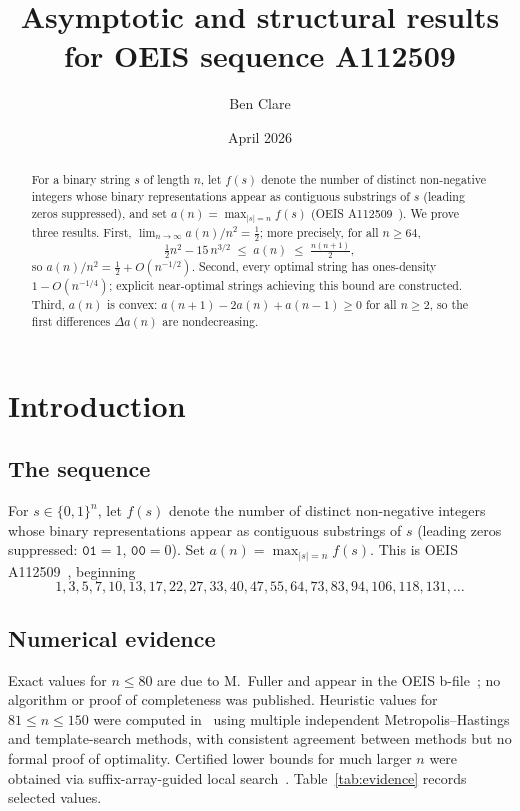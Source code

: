 ﻿\documentclass[11pt,a4paper]{article}
\title{Asymptotic and structural results for OEIS sequence A112509}
\author{Ben Clare}
\date{April 2026}
\theoremstyle{plain}
\theoremstyle{definition}
\theoremstyle{remark}
\begin{document}
\maketitle

\begin{abstract}
For a binary string $s$ of length $n$, let $f(s)$ denote the number of
distinct non-negative integers whose binary representations appear as
contiguous substrings of $s$ (leading zeros suppressed), and set
$a(n)=\max_{|s|=n}f(s)$ (OEIS A112509~\cite{oeis}).
We prove three results.
First, $\lim_{n\to\infty}a(n)/n^2=\frac{1}{2}$; more precisely,
for all $n\ge64$,
\[
  \tfrac{1}{2}n^2 - 15\,n^{3/2} \;\le\; a(n) \;\le\; \tfrac{n(n+1)}{2},
\]
so $a(n)/n^2 = \frac{1}{2}+O(n^{-1/2})$.
Second, every optimal string has ones-density $1-O(n^{-1/4})$;
explicit near-optimal strings achieving this bound are constructed.
Third, $a(n)$ is convex: $a(n+1)-2a(n)+a(n-1)\ge0$ for all $n\ge2$,
so the first differences $\Delta a(n)$ are nondecreasing.
\end{abstract}

\section{Introduction}

\subsection{The sequence}

For $s\in\{0,1\}^n$, let $f(s)$ denote the number of distinct
non-negative integers whose binary representations appear as contiguous
substrings of $s$ (leading zeros suppressed: $\mathtt{01}=1$,
$\mathtt{00}=0$).  Set $a(n)=\max_{|s|=n}f(s)$.  This is OEIS
A112509~\cite{oeis}, beginning
\[
  1,3,5,7,10,13,17,22,27,33,40,47,55,64,73,83,94,106,118,131,\ldots
\]

\subsection{Numerical evidence}

Exact values for $n\le80$ are due to M.\ Fuller and appear in the OEIS
b-file~\cite{oeis}; no algorithm or proof of completeness was published.
Heuristic values for $81\le n\le150$ were computed in~\cite{github}
using multiple independent Metropolis--Hastings and template-search
methods, with consistent agreement between methods but no formal proof
of optimality.
Certified lower bounds for much larger $n$ were obtained via
suffix-array-guided local search~\cite{github}.
Table~\ref{tab:evidence} records selected values.
\end{document}
